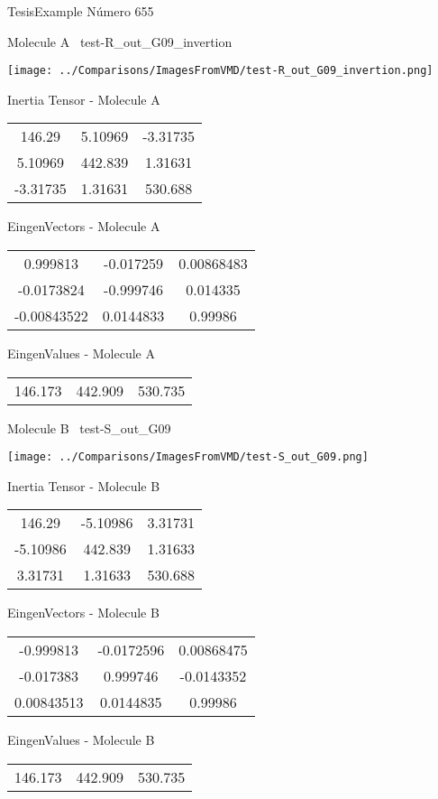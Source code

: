 \vtab[-3cm]
\begin{center}
{\large TesisExample \tab Número 655}
\end{center}
\begin{multicols}{2}
\begin{center}

Molecule A \
test-R\_out\_G09\_invertion

\texttt{[image: ../Comparisons/ImagesFromVMD/test-R\_out\_G09\_invertion.png]}

Inertia Tensor - Molecule A \\
\begin{tabular}{|c c c|}
146.29	 & 	5.10969	 & 	-3.31735	 \\
5.10969	 & 	442.839	 & 	1.31631	 \\
-3.31735	 & 	1.31631	 & 	530.688
\end{tabular}

\vtab
 EingenVectors - Molecule A     \\
\begin{tabular}{|c c c|}
0.999813	 & 	-0.017259	 & 	0.00868483	 \\
-0.0173824	 & 	-0.999746	 & 	0.014335	 \\
-0.00843522	 & 	0.0144833	 & 	0.99986
\end{tabular}

\vtab
 EingenValues - Molecule A     \\
\begin{tabular}{|c c c|}
146.173	 & 	442.909	 & 	530.735	 \\
\end{tabular}
\columnbreak

Molecule B \
test-S\_out\_G09

\texttt{[image: ../Comparisons/ImagesFromVMD/test-S\_out\_G09.png]}

Inertia Tensor - Molecule B \\
\begin{tabular}{|c c c|}
146.29	 & 	-5.10986	 & 	3.31731	 \\
-5.10986	 & 	442.839	 & 	1.31633	 \\
3.31731	 & 	1.31633	 & 	530.688
\end{tabular}

\vtab
 EingenVectors - Molecule B     \\
\begin{tabular}{|c c c|}
-0.999813	 & 	-0.0172596	 & 	0.00868475	 \\
-0.017383	 & 	0.999746	 & 	-0.0143352	 \\
0.00843513	 & 	0.0144835	 & 	0.99986
\end{tabular}

\vtab
 EingenValues - Molecule B     \\
\begin{tabular}{|c c c|}
146.173	 & 	442.909	 & 	530.735	 \\
\end{tabular}

\end{center}
\end{multicols}

